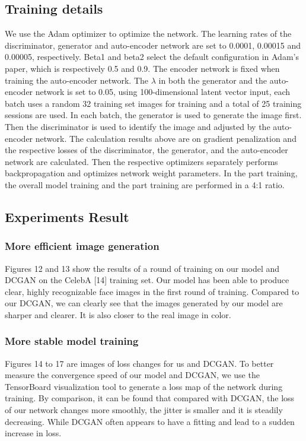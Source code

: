 \subsection{Training details}
We use the Adam optimizer to optimize the network. The learning rates of the discriminator, generator and auto-encoder network are set to 0.0001, 0.00015 and 0.00005, respectively.
Beta1 and beta2 select the default configuration in Adam's paper, which is respectively 0.5 and 0.9. The encoder network is fixed when training the auto-encoder network.
  The $\lambda$ in both the generator and the auto-encoder network is set to 0.05, using 100-dimensional latent vector input, each batch uses a random 32 training set images for training and a total of 25 training sessions are used. 
In each batch, the generator is used to generate the image first. Then the discriminator is used to identify the image and adjusted by the auto-encoder network.
The calculation results above are on gradient penalization and the respective losses of the discriminator, the generator, and the auto-encoder network are calculated. Then the respective optimizers separately performs backpropagation and optimizes network weight parameters. In the part training, the overall model training and the part training are performed in a 4:1 ratio.

\subsection{Experiments Result}
\subsubsection*{More efficient image generation} 
Figures 12 and 13 show the results of a round of training on our model and DCGAN on the CelebA [14] training set.
Our model has been able to produce clear, highly recognizable face images in the first round of training.
Compared to our DCGAN, we can clearly see that the images generated by our model are sharper and clearer. 
It is also closer to the real image in color.

\subsubsection*{More stable model training}
Figures 14 to 17 are images of loss changes for us and DCGAN.
To better measure the convergence speed of our model and DCGAN, we use the TensorBoard visualization tool to generate a loss map of the network during training.
By comparison, it can be found that compared with DCGAN, the loss of our network changes more smoothly, the jitter is smaller and it is steadily decreasing. While DCGAN often appears to have a fitting and lead to a sudden increase in loss.

